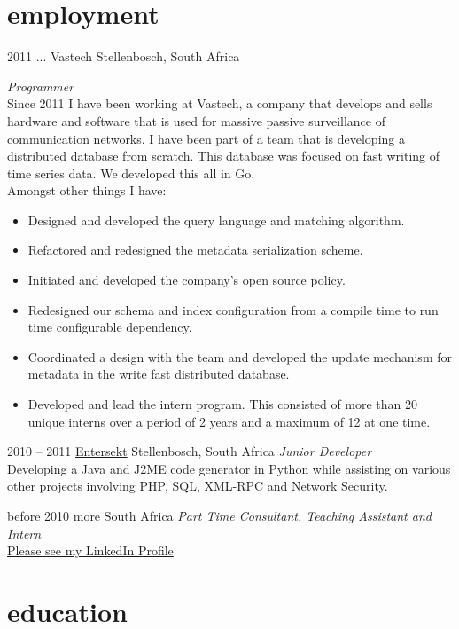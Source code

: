 \documentclass[]{friggeri-cv} %
\begin{document}
\section{employment}
\begin{entrylist}

\entry
{2011 ...}
{Vastech}
{Stellenbosch, South Africa}
{\emph{Programmer} \\
Since 2011 I have been working at Vastech, a company that develops and sells hardware and software that is used for massive passive surveillance of communication networks. I have been part of a team that is developing a distributed database from scratch. This database was focused on fast writing of time series data.  We developed this all in Go. \\
Amongst other things I have: \\
\begin{itemize}
\item Designed and developed the query language and matching algorithm.
\item Refactored and redesigned the metadata serialization scheme.
\item Initiated and developed the company's open source policy.
\item Redesigned our schema and index configuration from a compile time to run time configurable dependency.
\item Coordinated a design with the team and developed the update mechanism for metadata in the write fast distributed database.
\item Developed and lead the intern program. This consisted of more than 20 unique interns over a period of 2 years and a maximum of 12 at one time.
\end{itemize}
}

\entry
{2010 -- 2011}
{\href{https://www.entersekt.com/}{Entersekt}}
{Stellenbosch, South Africa}
{\emph{Junior Developer} \\
Developing a Java and J2ME code generator in Python while assisting on various other projects involving PHP, SQL, XML-RPC and Network Security.}

\entry
{before 2010}
{more}
{South Africa}
{\emph{Part Time Consultant, Teaching Assistant and Intern} \\
\href{https://za.linkedin.com/in/schulzewalter}{Please see my LinkedIn Profile}
}

\end{entrylist}

\section{education}
\end{document}
